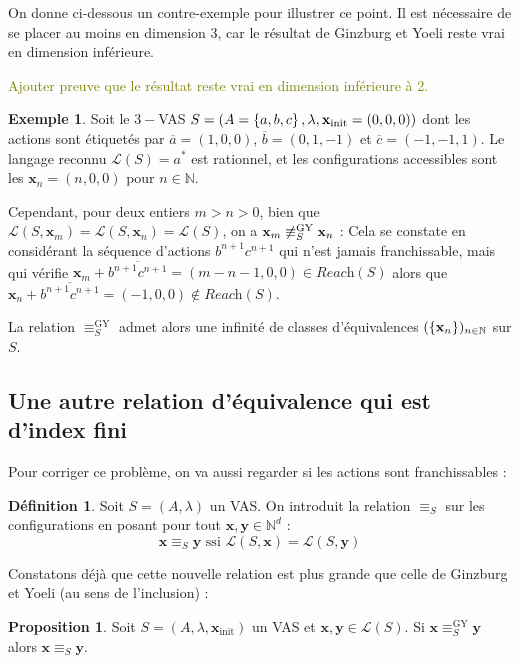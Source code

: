 \documentclass[a4paper,final]{article}
\theoremstyle{definition}
\newtheorem{Definition}[Theorem]{Définition}
\newtheorem{Proposition}[Theorem]{Proposition}
\newtheorem{Example}[Theorem]{Exemple}
\newcommand{\lucas}[1]{\textcolor{olive}{#1}}
\newcommand{\os}[1]{\left\{\mathinner{#1}\right\}}
\newcommand{\N}{\ensuremath{\mathbb{N}}}
\newcommand{\lang}{\ensuremath{\mathcal{L}}}
\newcommand{\reach}{\ensuremath{\textit{Reach}}}
\newcommand{\vect}[1]{\ensuremath{\mathbf{#1}}}
\newcommand{\rel}{\ensuremath{\equiv}}
\newcommand{\relGY}{\ensuremath{\equiv^\text{GY}_S}}
\newcommand{\ssi}{\ensuremath{\text{ ssi }}}
\newcommand{\xinit}{\ensuremath{\vect{x}_\text{init}}}
\newcommand{\valeur}[1]{\ensuremath{\overline{#1}}}
\begin{document}
\vspace{5mm}

On donne ci-dessous un contre-exemple pour illustrer ce point.
Il est nécessaire de se placer au moins en dimension 3, car le résultat de Ginzburg et Yoeli reste vrai en dimension inférieure.

\lucas{Ajouter preuve que le résultat reste vrai en dimension inférieure à 2.}

\begin{Example}
Soit le $3-$VAS $S = (A=\os{a,b,c}, \lambda, \xinit=(0,0,0))$ dont les actions sont étiquetés par $\valeur{a}=(1,0,0)$, $\valeur{b}=(0,1,-1)$ et $\valeur{c}=(-1,-1,1)$.
Le langage reconnu $\lang(S)=a^\ast$ est rationnel, et les configurations accessibles sont les $\vect{x}_n=(n,0,0)$ pour $n\in\N$.

Cependant, pour deux entiers $m>n>0$, bien que $\lang(S,\vect{x}_m) =\lang(S,\vect{x}_n) =\lang(S)$, on a $\vect{x}_m \not\relGY \vect{x}_n$ :
Cela se constate en considérant la séquence d'actions $b^{n+1}c^{n+1}$ qui n'est jamais franchissable, mais qui vérifie $\vect{x}_m +\valeur{b^{n+1}c^{n+1}} = (m-n-1,0,0)\in \reach(S)$ alors que $\vect{x}_n +\valeur{b^{n+1}c^{n+1}} = (-1,0,0)\notin \reach(S)$.

La relation $\relGY$ admet alors une infinité de classes d'équivalences $(\os{\vect{x}_n})_{n\in\N}$ sur $S$.
\end{Example}


\subsection{Une autre relation d'équivalence qui est d'index fini}
Pour corriger ce problème, on va aussi regarder si les actions sont franchissables :

\begin{Definition}
Soit $S=(A,\lambda)$ un VAS. On introduit la relation $\rel_S$ sur les configurations en posant pour tout $\vect{x},\vect{y} \in\N^d$ :
$$\vect{x} \rel_S \vect{y} \ssi \lang(S,\vect{x}) = \lang(S,\vect{y})$$
\end{Definition}


Constatons déjà que cette nouvelle relation est plus grande que celle de Ginzburg et Yoeli (au sens de l'inclusion) :

\begin{Proposition}
Soit $S=(A,\lambda,\xinit)$ un VAS et $\vect{x},\vect{y} \in\lang(S)$.
Si $\vect{x} \relGY \vect{y}$ alors $\vect{x} \rel_S \vect{y}$.
\end{Proposition}
\end{document}
